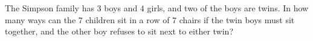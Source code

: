 The Simpson family has $3$ boys and $4$ girls, and two of the boys are twins. In how many ways can the $7$ children sit in a row of $7$ chairs if the twin boys must sit together, and the other boy refuses to sit next to either twin?
